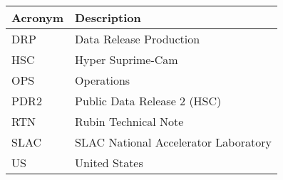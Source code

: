 \addtocounter{table}{-1}
\begin{longtable}{p{}p{}}\hline
\textbf{Acronym} & \textbf{Description}  \\\hline

DRP & Data Release Production \\\hline
HSC & Hyper Suprime-Cam \\\hline
OPS & Operations \\\hline
PDR2 & Public Data Release 2 (HSC) \\\hline
RTN & Rubin Technical Note \\\hline
SLAC & SLAC National Accelerator Laboratory \\\hline
US & United States \\\hline
\end{longtable}
